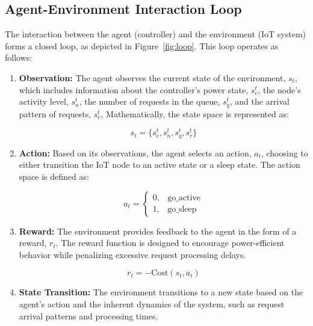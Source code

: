 \documentclass[11pt,a4paper]{article}
\begin{document}
\subsection{Agent-Environment Interaction Loop}
The interaction between the agent (controller) and the environment (IoT system) forms a closed loop, as depicted in Figure~\ref{fig:loop}. This loop operates as follows:
\begin{enumerate}
    \item \textbf{Observation:} The agent observes the current state of the environment, $s_t$, which includes information about the controller's power state, $s^t_c$, the node's activity level, $s^t_n$, the number of requests in the queue, $s^t_q$, and the arrival pattern of requests, $s^t_r$, Mathematically, the state space is represented as:

    \begin{equation}
        s_t = \{s^t_c, s^t_n, s^t_q, s^t_r\}
    \end{equation}

    \item \textbf{Action:} Based on its observations, the agent selects an action, $a_t$,  choosing to either transition the IoT node to an active state or a sleep state. The action space is defined as:

    \begin{equation}
        a_t = 
        \begin{cases}
            0, & \text{go\_active} \\
            1, & \text{go\_sleep}
        \end{cases}
    \end{equation}

    \item \textbf{Reward:} The environment provides feedback to the agent in the form of a reward, $r_t$. The reward function is designed to encourage power-efficient behavior while penalizing excessive request processing delays. 

    \begin{equation}
        r_t = -\text{Cost}(s_t, a_t)
    \end{equation}
    
    \item \textbf{State Transition:} The environment transitions to a new state based on the agent's action and the inherent dynamics of the system, such as request arrival patterns and processing times.
\end{enumerate}
\end{document}
